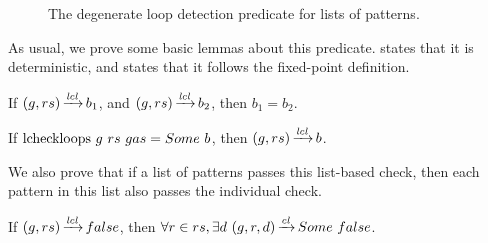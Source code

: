 \begin{figure}
    \centering
    
    \caption{The degenerate loop detection predicate for lists of patterns.}
    \label{fig:lcheckloops}
\end{figure}

As usual, we prove some basic lemmas
about this predicate.
states that it is
deterministic,
and 
states that it follows
the fixed-point definition.

\begin{lemma}
    \label{lemma:lcheckloops-determinism}
    If $(g,rs) \operatorname{\xrightarrow{\mathit{lcl}}} b_1$,
    and $(g,rs) \operatorname{\xrightarrow{\mathit{lcl}}} b_2$,
    then $b_1=b_2$.
\end{lemma}

\begin{lemma}
    \label{lemma:lcheckloops-follows}
    If $\text{lcheckloops}{}\ g\ rs\ gas = Some\ b$,
    then $(g,rs) \operatorname{\xrightarrow{\mathit{lcl}}} b$.
\end{lemma}

We also prove that if a list of patterns
passes this list-based check,
then each pattern in this list also
passes the individual check.

\begin{lemma}%
    \label{lemma:lcheckloops-safety}
    If $(g,rs) \operatorname{\xrightarrow{\mathit{lcl}}} false$,
    then $\forall r \in rs, \exists d\ \CheckLoops{g}{r}{d}{\Some false}$.
\end{lemma}
